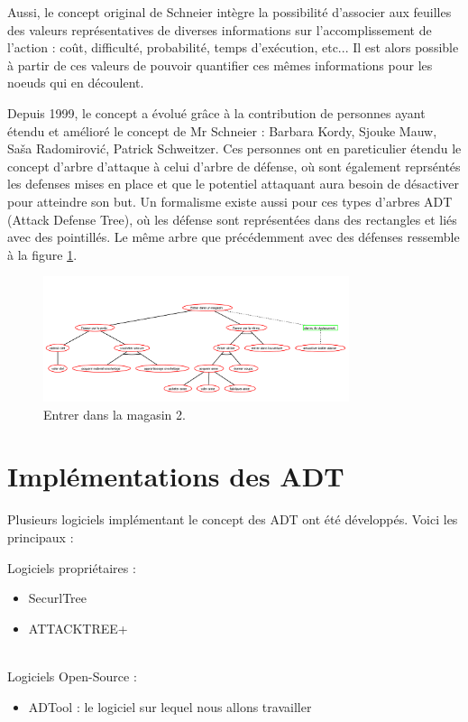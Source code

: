 		Aussi, le concept original de Schneier intègre la possibilité d'associer aux feuilles des valeurs représentatives de diverses informations sur l'accomplissement de l'action : coût, difficulté, probabilité, temps d'exécution, etc... Il est alors possible à partir de ces valeurs de pouvoir quantifier ces mêmes informations pour les noeuds qui en découlent.

		Depuis 1999, le concept a évolué grâce à la contribution de personnes ayant étendu et amélioré le concept de Mr Schneier : Barbara Kordy, Sjouke Mauw, Saša Radomirović, Patrick Schweitzer. Ces personnes ont en pareticulier étendu le concept d'arbre d'attaque à celui d'arbre de défense, où sont également reprséntés les defenses mises en place et que le potentiel attaquant aura besoin de désactiver pour atteindre son but. Un formalisme existe aussi pour ces types d'arbres ADT (Attack Defense Tree), où les défense sont représentées dans des rectangles et liés avec des pointillés. Le même arbre que précédemment avec des défenses ressemble à la figure \ref{fig:arbre_exemple_2}.

		\begin{figure}[h!]
            \begin{center}
                \includegraphics[width=0.8\textwidth]{figure/Entrer_dans_un_magasin2.png}
            \end{center}
            \caption{Entrer dans la magasin 2.}
            \label{fig:arbre_exemple_2}
		\end{figure}

	\section{Implémentations des ADT}
		Plusieurs logiciels implémentant le concept des ADT ont été développés. Voici les principaux :
        
		{\large Logiciels propriétaires :}
		\begin{itemize}
			\item SecurlTree
			\item ATTACKTREE+
		\end{itemize}
		~~\\
		{\large Logiciels Open-Source :}
		\begin{itemize}
			\item ADTool : le logiciel sur lequel nous allons travailler
		\end{itemize}
~~

